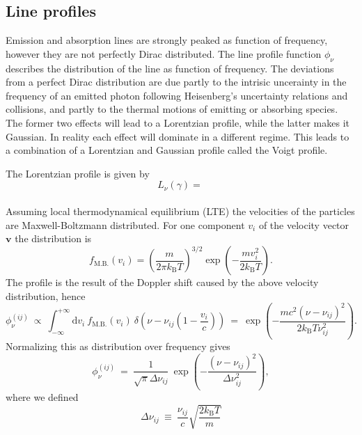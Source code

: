\documentclass[]{article}
\newcommand{\kb}{k_{\text{B}}}
\newcommand{\D}{\text{d}}
\begin{document}
\subsection{Line profiles}

Emission and absorption lines are strongly peaked as function of frequency, however they are not perfectly Dirac distributed. The line profile function $\phi_{\nu}$ describes the distribution of the line as function of frequency. The deviations from a perfect Dirac distribution are due partly to the intrisic uncerainty in the frequency of an emitted photon following Heisenberg's uncertainty relations and collisions, and partly to the thermal motions of emitting or absorbing species. The former two effects will lead to a Lorentzian profile, while the latter makes it Gaussian. In reality each effect will dominate in a different regime. This leads to a combination of a Lorentzian and Gaussian profile called the Voigt profile.

\bigskip

The Lorentzian profile is given by
\begin{equation}
L_{\nu}(\gamma) = \frac{}{}
\end{equation}


Assuming local thermodynamical equilibrium (LTE) the velocities of the particles are Maxwell-Boltzmann distributed. For one component $v_{i}$ of the velocity vector $\textbf{v}$ the distribution is
\begin{equation}
f_{\text{M.B.}}(v_{i}) = \left(\frac{m}{2\pi \kb T}\right)^{3/2} \exp\left( -\frac{m v_{i}^{2} }{2 \kb T} \right).
\end{equation}
The profile is the result of the Doppler shift caused by the above velocity distribution, hence
\begin{equation}
\phi^{(ij)}_{\nu} \ \propto \ \int_{-\infty}^{+\infty} \D v_{i} \ f_{\text{M.B.}}(v_{i}) \ \delta\left(\nu-\nu_{ij}\left(1-\frac{v_{i}}{c}\right)\right) \ = \ \exp\left( -\frac{mc^{2} (\nu-\nu_{ij})^{2} }{2 \kb T \nu_{ij}^{2}} \right).
\end{equation}
Normalizing this as distribution over frequency gives
\begin{equation}
\phi^{(ij)}_{\nu} \ = \ \frac{1}{\sqrt{\pi}\Delta\nu_{ij}} \ \exp\left( -\frac{(\nu-\nu_{ij})^{2} }{\Delta\nu_{ij}^{2}} \right),
\end{equation}
where we defined
\begin{equation}
\Delta \nu_{ij} \ \equiv \ \frac{\nu_{ij}}{c} \sqrt{\frac{2 \kb T}{m}}
\end{equation}
\end{document}
